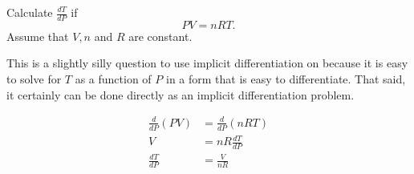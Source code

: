 \documentclass{ximera}
\author{Emma Smith Zbarsky}
\begin{document}
\begin{exercise}

Calculate $\frac{dT}{dP}$ if \[PV=nRT.\] Assume that $V, n$ and $R$ are
constant.


\begin{hint}
This is a slightly silly question to use implicit differentiation on
because it is easy to solve for $T$ as a function of $P$ in a form that
is easy to differentiate. That said, it certainly can be done directly
as an implicit differentiation problem.
\end{hint}


\begin{hint}
\begin{align*}
\frac{d}{dP}\left(PV\right) &= \frac{d}{dP}\left(nRT\right) \\
V &= nR\frac{dT}{dP} \\
\frac{dT}{dP} &= \frac{V}{nR}\end{align*}
\end{hint}


\begin{multipleChoice}
\end{multipleChoice}

\end{exercise}
\end{document}
